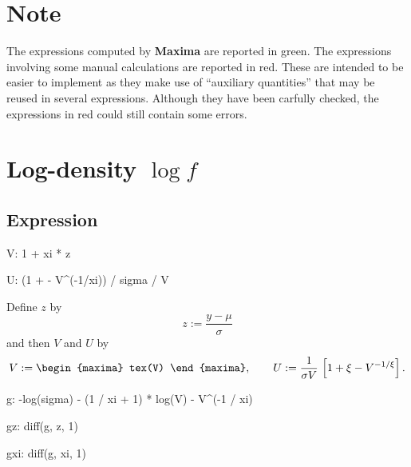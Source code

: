 

\section*{Note}

The expressions computed by \textbf{Maxima} are reported
{\color{MonVertF}in green}.  The expressions involving some manual
calculations are reported {\color{red}in red}. These are intended to
be easier to implement as they make use of ``auxiliary quantities''
that may be reused in several expressions. Although they have been
carfully checked, the expressions {\color{red}in red} could still
contain some errors.

\section{Log-density $\log f$}

\subsection{Expression}

\begin{maxima}
  V: 1 + xi * z
\end{maxima}
\begin{maxima}
  U: (1 + \xi - V^(-1/xi)) / sigma / V
\end{maxima}

Define $z$ by
$$
z := \frac{y - \mu}{\sigma}
$$
and then $V$ and $U$ by 
\[
V := 
\begin{maxima}
tex(V)
\end{maxima}, \qquad U:= \frac{1}{\sigma V}\,\left[ 1 + \xi - V^{-1/\xi}\right]. 
\]
\begin{maxima}
  g: -log(sigma) - (1 / xi + 1) * log(V) - V^(-1 / xi)
\end{maxima}
%
\begin{maxima}
  gz: diff(g, z, 1)
\end{maxima}%
\begin{maxima}
  gxi: diff(g, xi, 1)
\end{maxima}%

